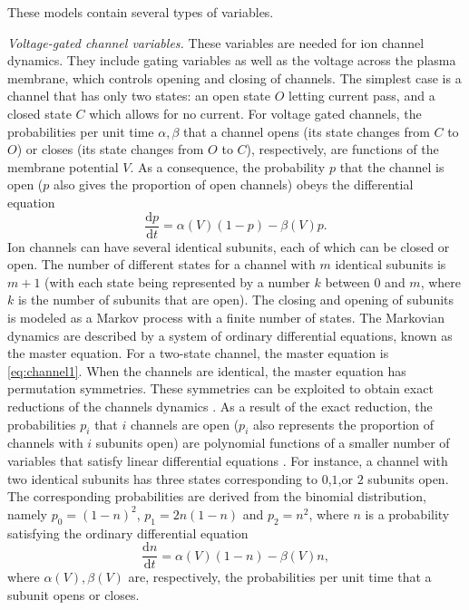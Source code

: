 \documentclass{llncs}
\newcommand{\D}[2]{ \ensuremath{ \frac{\mathrm{d} #1 }{\mathrm{d} #2 } }}
\begin{document}
These models contain several types of variables.

{\em Voltage-gated channel variables.} These variables are needed for ion
channel dynamics. They include gating variables as well as the voltage across
the plasma membrane, which controls opening and closing of channels.  The
simplest case is a channel that has only two states: an open state $O$
letting current pass, and a closed state $C$ which allows for no current. For
voltage gated channels, the probabilities per unit time $\alpha, \beta$ that a
channel opens (its state changes from $C$ to $O$) or closes (its state changes
from $O$ to $C$), respectively, are functions of the membrane potential $V$. As
a consequence, the probability $p$ that the channel is open ($p$ also gives the
proportion of open channels) obeys the differential equation
\begin{equation}
\D{p}{t} = \alpha(V) (1-p) - \beta(V) p. \label{eq:channel1}
\end{equation}
Ion channels can have several identical subunits, each of which can be closed
or open. The number of different states for a channel with $m$ identical
subunits is $m+1$ (with each state being represented by a number $k$ between
$0$ and $m$, where $k$ is the number of subunits that are open). The closing and opening of subunits is
modeled as a Markov process with a finite number of states. The Markovian dynamics are
described by a system of ordinary differential equations, known as the
master equation. For a two-state channel, the master equation is
\eqref{eq:channel1}.  When the channels are identical, the master equation has permutation
symmetries. These symmetries can be exploited to obtain
exact reductions of the channels dynamics \cite{keener2009invariant}. As a
result of the exact reduction, the probabilities $p_i$ that $i$ channels are
open ($p_i$ also represents the proportion of channels with $i$ subunits open)
are polynomial functions of a smaller number of variables that satisfy linear
differential equations \cite{keener1998mathematical,keener2009invariant}. For
instance, a channel with two identical subunits has three states corresponding
to $0$,$1$,or $2$ subunits open.  {The corresponding probabilities are derived
from the binomial distribution, namely} $p_0=(1-n)^2$, $p_1=2n(1-n)$ and $p_2=n^2$, where $n$  {is a probability }
satisfying the ordinary differential equation
\begin{equation}
\D{n}{t} = \alpha(V) (1-n) - \beta(V) n, \label{eq:channel2}
\end{equation}
where $\alpha(V),\beta(V)$ are, respectively, the probabilities per unit time that a subunit
opens or closes.
\end{document}
